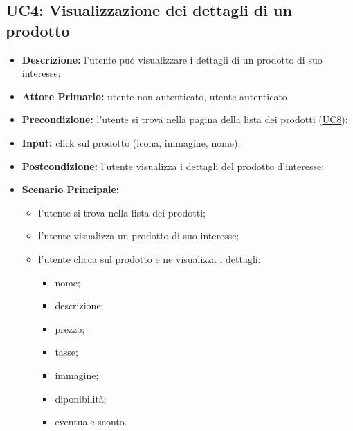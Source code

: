 \subsection{UC4: Visualizzazione dei dettagli di un prodotto }
\label{sec:UC4}
\begin{itemize}
    \item \textbf{Descrizione:} l'utente può visualizzare i dettagli di un prodotto di suo interesse;
    \item \textbf{Attore Primario:} utente non autenticato, utente autenticato
    \item \textbf{Precondizione:} l'utente si trova nella pagina della lista dei prodotti (\hyperref[sec:UC8]{\underline{UC8}});
    \item \textbf{Input:} click sul prodotto (icona, immagine, nome);
    \item \textbf{Postcondizione:} l'utente visualizza i dettagli del prodotto d'interesse;
    \item \textbf{Scenario Principale:}
          \begin{itemize}
              \item l'utente si trova nella lista dei prodotti;
              \item l'utente visualizza un prodotto di suo interesse;
              \item l'utente clicca sul prodotto e ne visualizza i dettagli:
                    \begin{itemize}
                        \item nome;
                        \item descrizione;
                        \item prezzo;
                        \item tasse;
                        \item immagine;
                        \item diponibilità;
                        \item eventuale sconto.
                    \end{itemize}
          \end{itemize}
\end{itemize}
